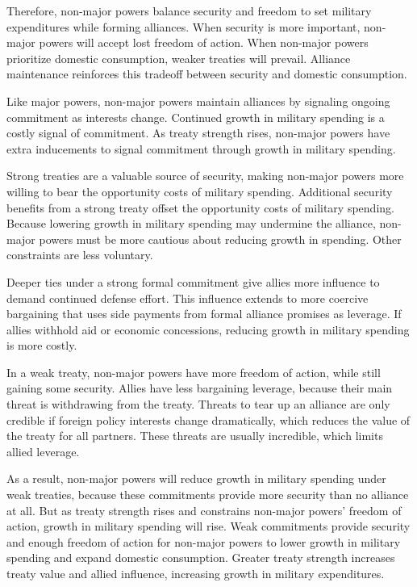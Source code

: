 \documentclass[12pt]{article}
\begin{document}
Therefore, non-major powers balance security and freedom to set military expenditures while forming alliances. 
When security is more important, non-major powers will accept lost freedom of action.
When non-major powers prioritize domestic consumption, weaker treaties will prevail. 
Alliance maintenance reinforces this tradeoff between security and domestic consumption. 


Like major powers, non-major powers maintain alliances by signaling ongoing commitment as interests change. 
Continued growth in military spending is a costly signal of commitment. 
As treaty strength rises, non-major powers have extra inducements to signal commitment through growth in military spending.

 
Strong treaties are a valuable source of security, making non-major powers more willing to bear the opportunity costs of military spending. 
Additional security benefits from a strong treaty offset the opportunity costs of military spending.
Because lowering growth in military spending may undermine the alliance, non-major powers must be more cautious about reducing growth in spending.
Other constraints are less voluntary.   


Deeper ties under a strong formal commitment give allies more influence to demand continued defense effort. 
This influence extends to more coercive bargaining that uses side payments from formal alliance promises as leverage. 
If allies withhold aid or economic concessions, reducing growth in military spending is more costly. 


In a weak treaty, non-major powers have more freedom of action, while still gaining some security.  
Allies have less bargaining leverage, because their main threat is withdrawing from the treaty. 
Threats to tear up an alliance are only credible if foreign policy interests change dramatically, which reduces the value of the treaty for all partners. 
These threats are usually incredible, which limits allied leverage. 


As a result, non-major powers will reduce growth in military spending under weak treaties, because these commitments provide more security than no alliance at all. 
But as treaty strength rises and constrains non-major powers' freedom of action, growth in military spending will rise. 
Weak commitments provide security and enough freedom of action for non-major powers to lower growth in military spending and expand domestic consumption. 
Greater treaty strength increases treaty value and allied influence, increasing growth in military expenditures. 
\end{document}
